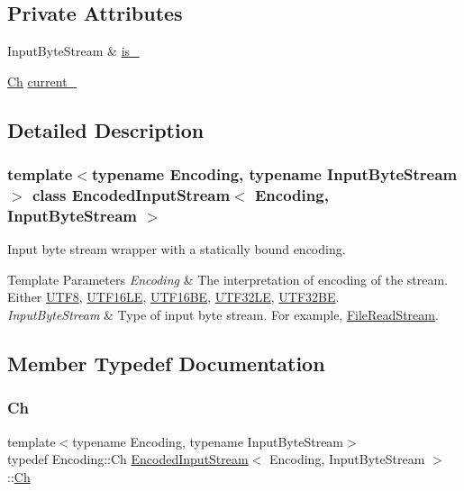 \subsection*{Private Attributes}
\begin{DoxyCompactItemize}
\item 
Input\+Byte\+Stream \& \hyperlink{classEncodedInputStream_ab07b45f34f288184313750af5f7077b6}{is\+\_\+}
\item 
\hyperlink{classEncodedInputStream_acc387a1364390da244bbb1ab07bdceca}{Ch} \hyperlink{classEncodedInputStream_a20b49879c87fdf6d6ba20e99f0cf7893}{current\+\_\+}
\end{DoxyCompactItemize}


\subsection{Detailed Description}
\subsubsection*{template$<$typename Encoding, typename Input\+Byte\+Stream$>$\newline
class Encoded\+Input\+Stream$<$ Encoding, Input\+Byte\+Stream $>$}

Input byte stream wrapper with a statically bound encoding. 


\begin{DoxyTemplParams}{Template Parameters}
{\em Encoding} & The interpretation of encoding of the stream. Either \hyperlink{structUTF8}{U\+T\+F8}, \hyperlink{structUTF16LE}{U\+T\+F16\+LE}, \hyperlink{structUTF16BE}{U\+T\+F16\+BE}, \hyperlink{structUTF32LE}{U\+T\+F32\+LE}, \hyperlink{structUTF32BE}{U\+T\+F32\+BE}. \\
\hline
{\em Input\+Byte\+Stream} & Type of input byte stream. For example, \hyperlink{classFileReadStream}{File\+Read\+Stream}. \\
\hline
\end{DoxyTemplParams}


\subsection{Member Typedef Documentation}
\mbox{\label{classEncodedInputStream_acc387a1364390da244bbb1ab07bdceca}} 
\subsubsection{\texorpdfstring{Ch}{Ch}}
{\footnotesize\ttfamily template$<$typename Encoding, typename Input\+Byte\+Stream$>$ \\
typedef Encoding\+::\+Ch \hyperlink{classEncodedInputStream}{Encoded\+Input\+Stream}$<$ Encoding, Input\+Byte\+Stream $>$\+::\hyperlink{classEncodedInputStream_acc387a1364390da244bbb1ab07bdceca}{Ch}}



